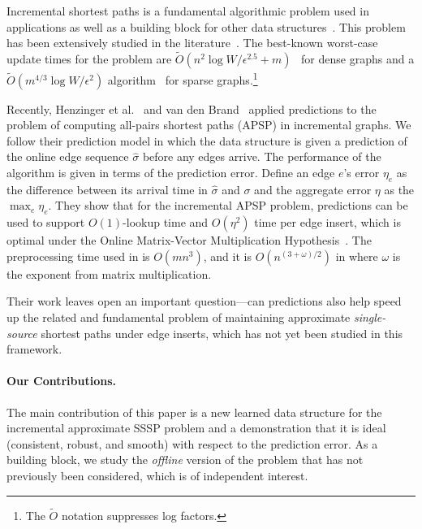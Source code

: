 Incremental shortest paths is a fundamental algorithmic problem used in applications as well as a building block for other data structures~\cite{RodittyZ11,HenzingerKN16}. 
This problem has been extensively studied in the literature~\cite{GutenbergW20,BernsteinGS21,BernsteinGW20,KyngMeGu22,chechik2021incremental,henzinger2014sublinear, henzinger2015improved}. 
The best-known worst-case update times for the problem are $\tilde{O}(n
^2 \log W/\epsilon^{2.5} + m)$~\cite{probst2020new} for dense graphs and a $\tilde{O}(m^{4/3}\log W/\epsilon^2)$ algorithm~\cite{KyngMeGu22} for sparse graphs.\footnote{The $\tilde{O}$ notation suppresses log factors.}  

Recently, Henzinger et al.~\cite{HenzingerSSY24} and van den Brand~\cite{BrandFNP24} applied predictions to the problem of computing all-pairs shortest paths (APSP) in incremental graphs.  
We follow their prediction model in which the data structure is given a prediction of the online edge sequence $\hat{\sigma}$ before any edges arrive.  The performance of the algorithm is given in terms of the prediction error.  Define an edge $e$'s error $\eta_e$ as the difference between its arrival time in $\hat{\sigma}$ and $\sigma$ and the aggregate error $\eta$ as the $\max_{e} \eta_e$.  They show that for the incremental APSP problem, predictions can be used to support $O(1)$-lookup time and $O(\eta^2)$ time per edge insert, which is optimal under the Online Matrix-Vector Multiplication Hypothesis~\cite{BrandFNP24}.  The preprocessing time used in \cite{HenzingerSSY24} is $O(mn^3)$, and it is $O(n^{(3 + \omega)/2})$ in \cite{BrandFNP24} where $\omega$ is the exponent from matrix multiplication. 

Their work leaves open an important question---can predictions also help speed up the related and fundamental problem of maintaining approximate \emph{single-source} shortest paths under edge inserts, which has not yet been studied in this framework.
 
\paragraph{Our Contributions.}   The main contribution of this paper is a new learned data structure for the incremental approximate SSSP problem and a demonstration that it is ideal (consistent, robust, and smooth) with respect to the prediction error.
As a building block, we study the \emph{offline} version of the problem that has not previously been considered, which is of independent interest. 

